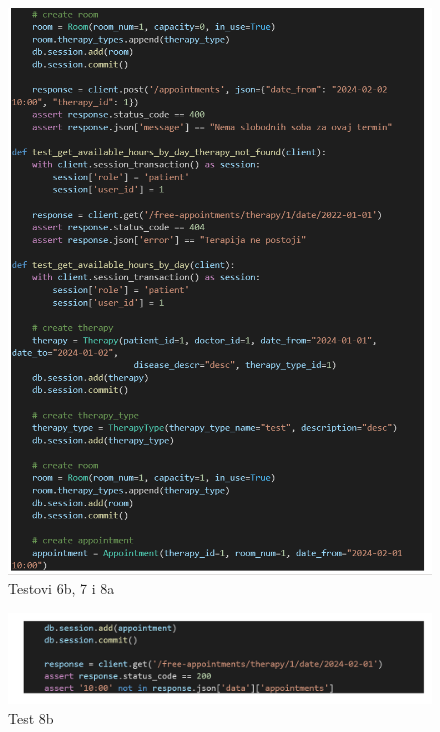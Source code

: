 			\begin{figure}[H]
				\includegraphics[scale=0.3]{slike/testovi_6dio_7_8dio.PNG} %
				\centering
				\caption{Testovi 6b, 7 i 8a}
				\label{fig:testovi6b78a}
			\end{figure}
			
			\begin{figure}[H]
				\includegraphics[scale=0.3]{slike/testovi_8dio.PNG} %
				\centering
				\caption{Test 8b}
				\label{fig:testovi8b}
			\end{figure}
			
